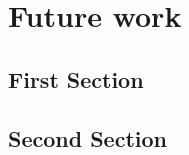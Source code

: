 \chapter{Future work}
\label{sec:future}
\kant[12-13] %
\section{First Section}
\kant[14]    %
\section{Second Section}
\kant[15]    %